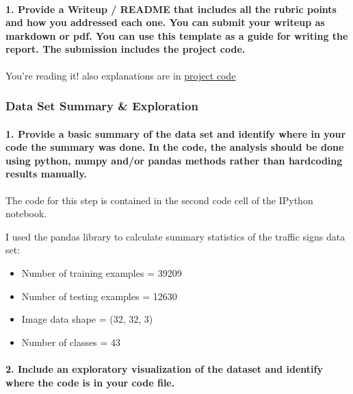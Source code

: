 \documentclass[11pt]{article}
\providecommand{\tightlist}{%
      \setlength{\itemsep}{0pt}\setlength{\parskip}{0pt}}
\begin{document}
\paragraph{1. Provide a Writeup / README that includes all the rubric
points and how you addressed each one. You can submit your writeup as
markdown or pdf. You can use this template as a guide for writing the
report. The submission includes the project
code.}\label{provide-a-writeup-readme-that-includes-all-the-rubric-points-and-how-you-addressed-each-one.-you-can-submit-your-writeup-as-markdown-or-pdf.-you-can-use-this-template-as-a-guide-for-writing-the-report.-the-submission-includes-the-project-code.}

You're reading it! also explanations are in
\href{https://github.com/adarshakb/CarND-Traffic-Sign-Classifier-Project}{project
code}

\subsubsection{Data Set Summary \&
Exploration}\label{data-set-summary-exploration}

\paragraph{1. Provide a basic summary of the data set and identify where
in your code the summary was done. In the code, the analysis should be
done using python, numpy and/or pandas methods rather than hardcoding
results
manually.}\label{provide-a-basic-summary-of-the-data-set-and-identify-where-in-your-code-the-summary-was-done.-in-the-code-the-analysis-should-be-done-using-python-numpy-andor-pandas-methods-rather-than-hardcoding-results-manually.}

The code for this step is contained in the second code cell of the
IPython notebook.

I used the pandas library to calculate summary statistics of the traffic
signs data set:

\begin{itemize}
\tightlist
\item
  Number of training examples = 39209
\item
  Number of testing examples = 12630
\item
  Image data shape = (32, 32, 3)
\item
  Number of classes = 43
\end{itemize}

\paragraph{2. Include an exploratory visualization of the dataset and
identify where the code is in your code
file.}\label{include-an-exploratory-visualization-of-the-dataset-and-identify-where-the-code-is-in-your-code-file.}
\end{document}
